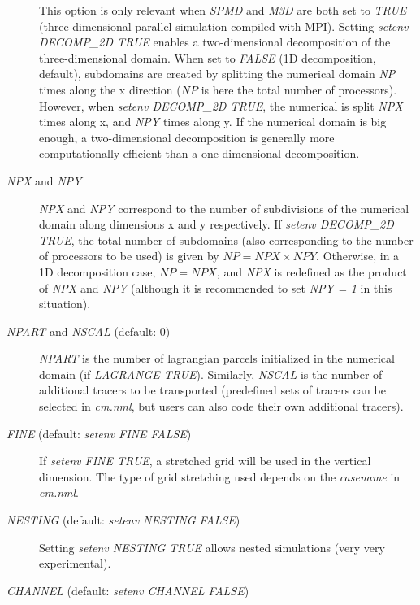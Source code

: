 \documentclass[12pt,A4,french]{article}
\begin{document}
\begin{description}
This option is only relevant when {\it SPMD} and {\it M3D} are both set to {\it TRUE} (three-dimensional parallel simulation compiled with MPI). Setting {\it setenv DECOMP\_2D TRUE} enables a two-dimensional decomposition of the three-dimensional domain. When set to {\it FALSE} (1D decomposition, default), subdomains are created by splitting the numerical domain {\it NP} times along the x direction ($NP$ is here the total number of processors). However, when {\it setenv DECOMP\_2D TRUE}, the numerical is split {\it NPX} times along x, and {\it NPY} times along y. If the numerical domain is big enough, a two-dimensional decomposition is generally more computationally efficient than a one-dimensional decomposition.

\item[{\it NPX} and {\it NPY}]

{\it NPX} and {\it NPY} correspond to the number of subdivisions of the numerical domain along dimensions x and y respectively. If {\it setenv DECOMP\_2D TRUE}, the total number of subdomains (also corresponding to the number of processors to be used) is given by $NP = NPX\times NPY$. Otherwise, in a 1D decomposition case, $NP = NPX$, and {\it NPX} is redefined as the product of {\it NPX} and {\it NPY} (although it is recommended to set {\it NPY = 1} in this situation).

\item[{\it NPART} and {\it NSCAL} (default: 0)]

{\it NPART} is the number of lagrangian parcels initialized in the numerical domain (if {\it LAGRANGE TRUE}). Similarly, {\it NSCAL} is the number of additional tracers to be transported (predefined sets of tracers can be selected in {\it cm.nml}, but users can also code their own additional tracers). 

\item[{\it FINE} (default: {\it setenv FINE FALSE})]

If {\it setenv FINE TRUE}, a stretched grid will be used in the vertical dimension. The type of grid stretching used depends on the {\it casename} in {\it cm.nml}.

\item[{\it NESTING} (default: {\it setenv NESTING FALSE})]

Setting {\it setenv NESTING TRUE} allows nested simulations (very very experimental).

\item[{\it CHANNEL} (default: {\it setenv CHANNEL FALSE})]


\end{description}
\end{document}
